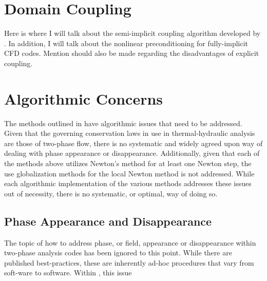 \section{Domain Coupling}
\label{sect:code_coupling}
Here is where I will talk about the semi-implicit coupling algorithm developed by \citet{Weaver2002}.
In addition, I will talk about the nonlinear preconditioning for fully-implicit CFD codes.
Mention should also be made regarding the disadvantages of explicit coupling.
\section{Algorithmic Concerns}
\label{sect:algorithmic_concerns}
The methods outlined in  have algorithmic issues that need to be addressed.
Given that the governing conservation laws in use in thermal-hydraulic analysis are those of two-phase flow, there is no systematic and widely agreed upon way of dealing with phase appearance or disappearance.
Additionally, given that each of the methods above utilizes Newton's method for at least one Newton step, the use globalization methods for the local Newton method is not addressed.
While each algorithmic implementation of the various methods addresses these issues out of necessity, there is no systematic, or optimal, way of doing so. 

\subsection{Phase Appearance and Disappearance}
\label{subsect:phase_change}
The topic of how to address phase, or field, appearance or disappearance within two-phase analysis codes has been ignored to this point.
While there are published best-practices\cite{Bestion2000}, these are inherently ad-hoc procedures that vary from soft-ware to software.
Within \cobra, this issue

